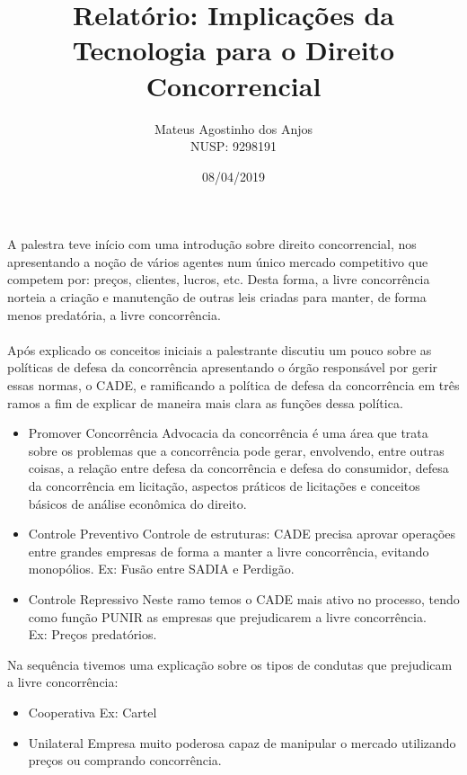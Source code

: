 \documentclass{article}
\title{Relatório: Implicações da Tecnologia para o Direito Concorrencial}
\author{Mateus Agostinho dos Anjos\\
NUSP: 9298191}
\date{08/04/2019}
\begin{document}
	\maketitle
	\paragraph{}
		A palestra teve início com uma introdução sobre direito concorrencial,
		nos apresentando a noção de vários agentes num único mercado competitivo
		que competem por: preços, clientes, lucros, etc. 
		Desta forma, a livre concorrência norteia a criação e manutenção de outras
		leis criadas para manter, de forma menos predatória, a livre concorrência.
	\paragraph{}
		Após explicado os conceitos iniciais a palestrante discutiu um pouco sobre
		as políticas de defesa da concorrência apresentando o órgão responsável
		por gerir essas normas, o CADE, e ramificando a política de defesa da 
		concorrência em três ramos a fim de explicar de maneira mais clara as
		funções dessa política.
		\begin{itemize}
			\item
				Promover Concorrência
				\subitem
					Advocacia da concorrência é uma área que trata sobre os
					problemas que a concorrência pode gerar, envolvendo, entre
					outras coisas, a relação entre defesa da concorrência e defesa
					do consumidor, defesa da concorrência em licitação, aspectos 
					práticos de licitações e conceitos básicos de análise econômica do 
					direito.
			\item
				Controle Preventivo
				\subitem
					Controle de estruturas: CADE precisa aprovar operações entre
					grandes empresas de forma a manter a livre concorrência,
					evitando monopólios. Ex: Fusão entre SADIA e Perdigão.
			\item
				Controle Repressivo
				\subitem
					Neste ramo temos o CADE mais ativo no processo, tendo como
					função PUNIR as empresas que prejudicarem a livre concorrência.
					\\
					Ex: Preços predatórios.		 
		\end{itemize}
		Na sequência tivemos uma explicação sobre os tipos de condutas que
		prejudicam a livre concorrência:
		\begin{itemize}				
			\item
				Cooperativa
				\subitem
					Ex: Cartel
			\item
				Unilateral
				\subitem
					Empresa muito poderosa capaz de manipular o mercado utilizando
					preços ou comprando concorrência.
		\end{itemize}
\end{document}
